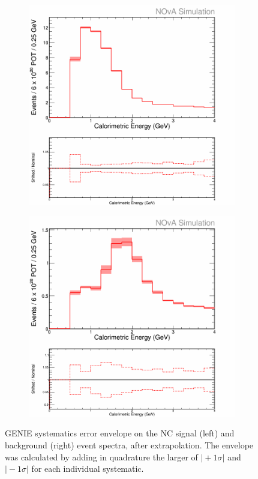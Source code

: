 \begin{figure}[h]
  \centering
  \begin{subfigure}{.48\textwidth}
    \centering
    \includegraphics[width=1\linewidth]{figures/cNCEXGENIESysts.png}
  \end{subfigure}
  \begin{subfigure}{.48\textwidth}
    \centering
    \includegraphics[width=1\linewidth]{figures/cBGEXGENIESysts.png}
  \end{subfigure}
  \caption[GENIE Systematic Error Envelopes]{GENIE systematics error envelope on the NC signal (left) and background (right) event spectra, after extrapolation. The envelope was calculated by adding in quadrature the larger of $\vert +1\sigma \vert$ and $\vert -1\sigma \vert$ for each individual systematic.}
  \label{fig:SystGENIE}
\end{figure}

